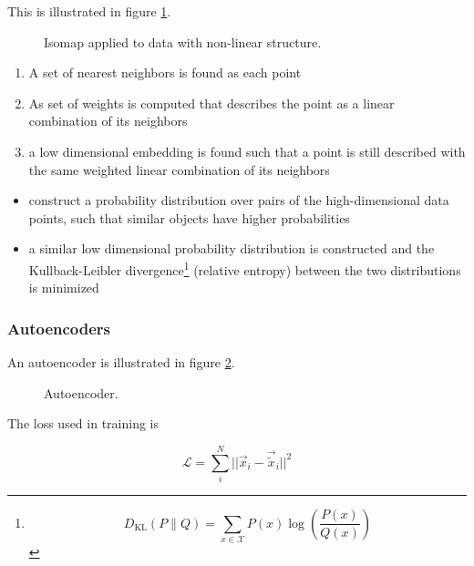 This is illustrated in figure \ref{fig:isomap}.

\begin{figure}[!htb]
    \centering
    
    \caption{Isomap applied to data with non-linear structure.}
    \label{fig:isomap}
\end{figure}

\begin{enumerate}
    \item A set of nearest neighbors is found as each point
    \item As set of weights is computed that describes the point as a linear combination of its neighbors
    \item a low dimensional embedding is found such that a point is still described with the same weighted linear combination of its neighbors
\end{enumerate}

\begin{itemize}
    \item construct a probability distribution over pairs of the high-dimensional data points,
    such that similar objects have higher probabilities
    \item a similar low dimensional probability distribution is constructed
    and the Kullback-Leibler divergence\footnote{\begin{equation}
        D_{\mathrm{KL}}(P \| Q)=\sum_{x \in \mathcal{X}} P(x) \log \left(\frac{P(x)}{Q(x)}\right)
        \end{equation}} (relative entropy) between the two distributions is minimized
\end{itemize}

\subsubsection{Autoencoders}

An autoencoder is illustrated in figure \ref{fig:autoencoder}.

\begin{figure}[!htb]
    \centering
    
    \caption{Autoencoder.}
    \label{fig:autoencoder}
\end{figure}

The loss used in training is

\begin{equation}
    \mathcal{L} = \sum_i^N ||\vec{x}_i - \vec{\tilde{x}}_i||^2
\end{equation}

\pagebreak